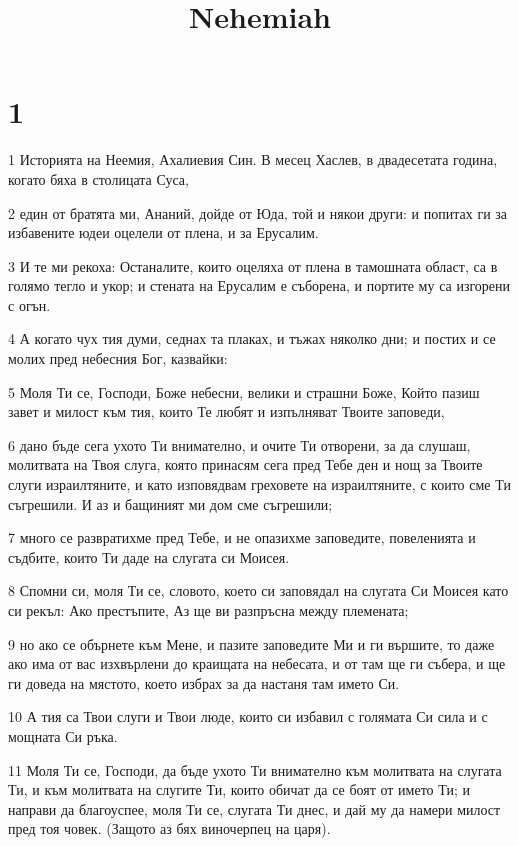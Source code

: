 

\title{Nehemiah}


\chapter{1}

\par 1 Историята на Неемия, Ахалиевия Син. В месец Хаслев, в двадесетата година, когато бяха в столицата Суса,
\par 2 един от братята ми, Ананий, дойде от Юда, той и някои други: и попитах ги за избавените юдеи оцелели от плена, и за Ерусалим.
\par 3 И те ми рекоха: Останалите, които оцеляха от плена в тамошната област, са в голямо тегло и укор; и стената на Ерусалим е съборена, и портите му са изгорени с огън.
\par 4 А когато чух тия думи, седнах та плаках, и тъжах няколко дни; и постих и се молих пред небесния Бог, казвайки:
\par 5 Моля Ти се, Господи, Боже небесни, велики и страшни Боже, Който пазиш завет и милост към тия, които Те любят и изпълняват Твоите заповеди,
\par 6 дано бъде сега ухото Ти внимателно, и очите Ти отворени, за да слушаш, молитвата на Твоя слуга, която принасям сега пред Тебе ден и нощ за Твоите слуги израилтяните, и като изповядвам греховете на израилтяните, с които сме Ти съгрешили. И аз и бащиният ми дом сме съгрешили;
\par 7 много се развратихме пред Тебе, и не опазихме заповедите, повеленията и съдбите, които Ти даде на слугата си Моисея.
\par 8 Спомни си, моля Ти се, словото, което си заповядал на слугата Си Моисея като си рекъл: Ако престъпите, Аз ще ви разпръсна между племената;
\par 9 но ако се обърнете към Мене, и пазите заповедите Ми и ги вършите, то даже ако има от вас изхвърлени до краищата на небесата, и от там ще ги събера, и ще ги доведа на мястото, което избрах за да настаня там името Си.
\par 10 А тия са Твои слуги и Твои люде, които си избавил с голямата Си сила и с мощната Си ръка.
\par 11 Моля Ти се, Господи, да бъде ухото Ти внимателно към молитвата на слугата Ти, и към молитвата на слугите Ти, които обичат да се боят от името Ти; и направи да благоуспее, моля Ти се, слугата Ти днес, и дай му да намери милост пред тоя човек. (Защото аз бях виночерпец на царя).


